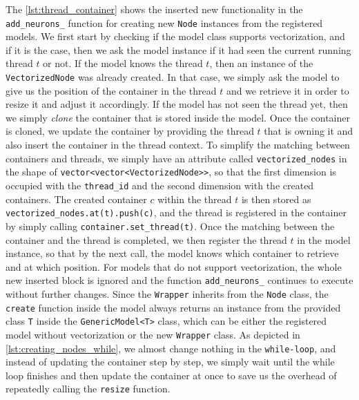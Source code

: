 The \autoref{lst:thread_container} shows the inserted new functionality in the \texttt{add\_neurons\_} function for creating new \texttt{Node} instances from the registered models. We first start by checking if the model class supports vectorization, and if it is the case, then we ask the model instance if it had seen the current running thread $t$ or not. If the model knows the thread $t$, then an instance of the \texttt{VectorizedNode} was already created. In that case, we simply ask the model to give us the position of the container in the thread $t$ and we retrieve it in order to resize it and adjust it accordingly. If the model has not seen the thread yet, then we simply \emph{clone} the container that is stored inside the model. Once the container is cloned, we update the container by providing  the thread $t$ that is owning it and also insert the container in the thread context. To simplify the matching between containers and threads, we simply have an attribute called \texttt{vectorized\_nodes} in the shape of \texttt{vector<vector<VectorizedNode>>}, so that the first dimension is occupied with the \texttt{thread\_id} and the second dimension with the created containers. The created container $c$ within the thread $t$ is then stored as \texttt{vectorized\_nodes.at(t).push(c)}, and the thread is registered in the container by simply calling \texttt{container.set\_thread(t)}. Once the matching between the container and the thread is completed, we then register the thread $t$ in the model instance, so that by the next call, the model knows which container to retrieve and at which position.  For models that do not support vectorization, the whole new inserted block is ignored and the function \texttt{add\_neurons\_}  continues to execute without further changes. Since the \texttt{Wrapper} inherits from the \texttt{Node} class, the \texttt{create} function inside the model always returns an instance from the provided class \texttt{T} inside the \texttt{GenericModel<T>} class, which can be either the registered model without vectorization or the new \texttt{Wrapper} class. As depicted in \autoref{lst:creating_nodes_while}, we almost change nothing in the \texttt{while-loop}, and instead of updating the container step by step, we simply wait until the while loop finishes and then update the container at once to save us the overhead of repeatedly calling the \texttt{resize} function.\\


